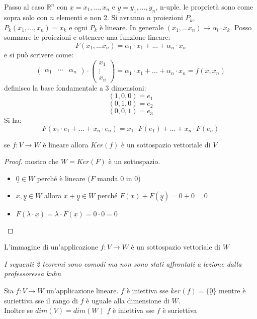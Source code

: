 \documentclass[a4paper,12pt, oneside]{book}
\begin{document}
Passo al caso $\mathbb{R}^n$ con $\underline{x}=x_1,...,x_n$ e $\underline{y}=y_1,...,y_n$, n-uple. le proprietà sono come sopra solo con $n$ elementi e non 2. Si avranno $n$ proiezioni $P_k$, $P_k(x_1,...,x_n)=x_k$ e ogni $P_k$ è lineare. In generale $(x_1,...x_n)\rightarrow\alpha_l\cdot x_k$. Posso sommare le proiezioni e ottenere una funzione lineare:$$F(x_1,...x_n)=\alpha_1\cdot x_1+...+\alpha_n\cdot x_n$$
e si può scrivere come:
$$
	\left(\begin{matrix}
			\alpha_1 & \cdots & \alpha_n
		\end{matrix}\right)\cdot
	\left(\begin{matrix}
			x_1    \\
			\vdots \\
			x_n
		\end{matrix}\right)=\alpha_1\cdot x_1+...+\alpha_n\cdot x_n=f(x,x_n)
$$
definisco la base fondamentale a 3 dimensioni:
$$(1,0,0)=e_1$$
$$(0,1,0)=e_2$$
$$(0,0,1)=e_3$$
Si ha: $$F(x_1\cdot e_1+...+x_n\cdot e_n)=x_1\cdot F(e_1)+...+x_n\cdot F(e_n)$$
\newpage
\begin{teorema}
	se $f:V\rightarrow W$ è lineare allora $Ker(f)$ è un sottospazio vettoriale di $V$
\end{teorema}
\begin{proof}
	mostro che $W=Ker(F)$ è un sottospazio.
	\begin{itemize}
		\item $\underline{0}\in W$ perché è lineare ($F$ manda 0 in 0)
		\item $\underline{x},\underline{y}\in W $ allora $\underline{x}+\underline{y}\in W$ perché $F(\underline{x})+F(\underline{y})=0+0=0$
		\item $F(\lambda\cdot \underline{x})=\lambda\cdot F(\underline{x})=0\cdot 0=0$
	\end{itemize}
\end{proof}
\begin{teorema}
	L'immagine di un'applicazione $f:V\rightarrow W$ è un sottospazio vettoriale di $W$
\end{teorema}
\textit{I seguenti 2 teoremi sono comodi ma non sono stati affrontati a lezione dalla professoressa kuhn}
\begin{teorema}
	Sia $f:V\rightarrow W$ un'applicazione lineare. $f$ è iniettiva sse $ker(f)=\{\underline{0}\}$ mentre è suriettiva sse il rango di $f$ è uguale alla dimensione di $W$.\\
	Inoltre se $dim(V)=dim(W)$ $f$ è iniettiva sse $f$ è suriettiva
\end{teorema}
\end{document}
